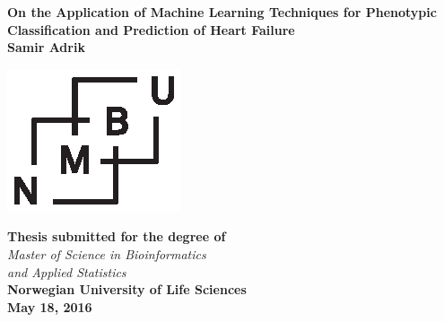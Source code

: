 \documentclass[../thesis.tex]{subfiles}
\begin{document}
\begin{titlepage}
\begin{center}
\vspace*{0,25cm}\Large{\textbf{On the Application of Machine Learning Techniques for Phenotypic Classification and Prediction of Heart Failure}}\\[0,4cm]

\vspace*{1,5cm}\large{\textbf{Samir Adrik}}

\vspace*{3cm}\includegraphics[scale=1.5]{../images/NMBU.eps}

\vspace{1cm}\normalsize{\textbf{Thesis submitted for the degree of}\\[0,1cm] \textit{Master of Science in Bioinformatics\\ and Applied Statistics}}\\[0,5cm]

\normalsize{\textbf{Norwegian University of Life Sciences}}\\[0,5cm]

\normalsize{\textbf{May 18, 2016}}
\end{center}
\end{titlepage}

\newpage{\pagestyle{empty}\cleardoublepage}
\end{document}
